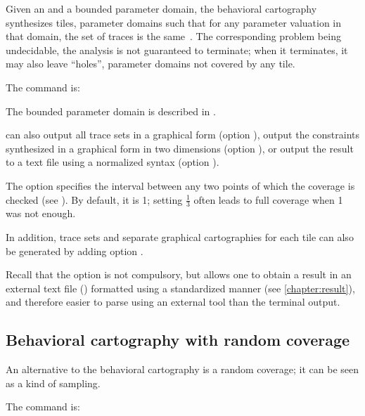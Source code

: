 Given an \NIPTA{} and a bounded parameter domain, the behavioral cartography~\BC{} synthesizes tiles, \ie{} parameter domains such that for any parameter valuation in that domain, the set of traces is the same~\cite{AF10}.
The corresponding problem being undecidable, the analysis is not guaranteed to terminate; when it terminates, it may also leave ``holes'', \ie{} parameter domains not covered by any tile.

The command is:


The bounded parameter domain is described in .

\imitator{} can also
	output all trace sets in a graphical form (option ),
	output the constraints synthesized in a graphical form in two dimensions (option ),
	or
	output the result to a text file using a normalized syntax (option ).

The option  specifies the interval between any two points of which the coverage is checked (see \cite{AF10}).
By default, it is 1; setting $\frac{1}{3}$ often leads to full coverage when 1 was not enough.

In addition, trace sets and separate graphical cartographies for each tile can also be generated by adding option .

Recall that the option  is not compulsory, but allows one to obtain a result in an external text file () formatted using a standardized manner (see \cref{chapter:result}), and therefore easier to parse using an external tool than the terminal output.



\subsection*{Behavioral cartography with random coverage}\label{sss:mode:BC:random}

An alternative to the behavioral cartography is a random coverage; it can be seen as a kind of sampling.

The command is:


